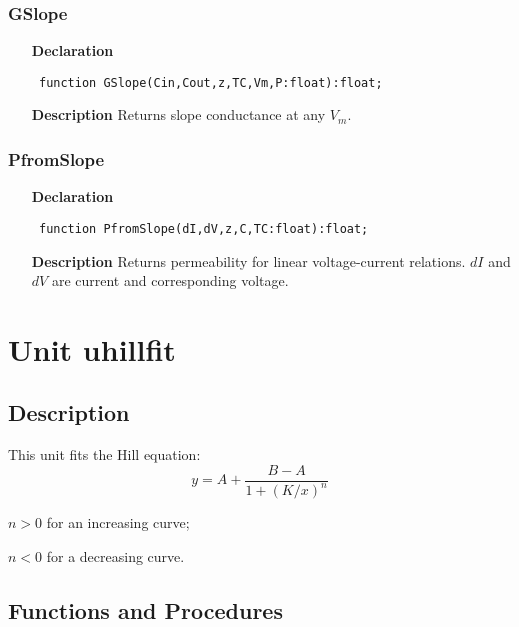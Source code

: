 \documentclass[12pt,a4paper,oneside]{report}
\newcommand{\declarationitem}[1]{\textbf{#1}}
\newcommand{\descriptiontitle}[1]{\textbf{#1}}
\newcommand{\code}[1]{\texttt{#1}}
\begin{document}
\subsubsection{GSlope}
\label{ugoldman-GSlope}
\begin{itemize}\item[\declarationitem{Declaration}\hfill]
	\begin{flushleft}
		\code{
			function GSlope(Cin,Cout,z,TC,Vm,P:float):float;}
		
	\end{flushleft}
	
	\par
	\item[\descriptiontitle{Description}]
	Returns slope conductance at any $V_m$.
	
\end{itemize}
\subsubsection{PfromSlope}
\label{ugoldman-PfromSlope}
\begin{itemize}\item[\declarationitem{Declaration}\hfill]
	\begin{flushleft}
		\code{
			function PfromSlope(dI,dV,z,C,TC:float):float;}
		
	\end{flushleft}
	
	\par
	\item[\descriptiontitle{Description}]
	Returns permeability for linear voltage-current relations. $dI$ and $dV$ are current and corresponding voltage.
	
\end{itemize}
\section{Unit uhillfit}
\label{uhillfit}
\subsection{Description}
This unit fits the Hill equation:
$$
y=A+\frac{B-A}{1+(K/x)^n}
$$

$n>0$ for an increasing curve; 

$n<0$ for a decreasing curve. 
\subsection{Functions and Procedures}
\end{document}
